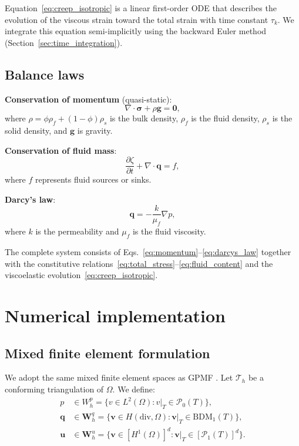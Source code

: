 \documentclass[a4paper,fleqn,longmktitle]{cas-sc}
\begin{document}
Equation~\eqref{eq:creep_isotropic} is a linear first-order ODE that describes
the evolution of the viscous strain toward the total strain with time constant
$\tau_k$. We integrate this equation semi-implicitly using the backward Euler
method (Section~\ref{sec:time_integration}).

\subsection{Balance laws}

\noindent\textbf{Conservation of momentum} (quasi-static):
\begin{equation}
\nabla\cdot\bm{\sigma} + \rho \bm{g} = \bm{0},
\label{eq:momentum}
\end{equation}
where $\rho = \phi \rho_f + (1-\phi)\rho_s$ is the bulk density, $\rho_f$ is
the fluid density, $\rho_s$ is the solid density, and $\bm{g}$ is gravity.

\noindent\textbf{Conservation of fluid mass}:
\begin{equation}
\frac{\partial \zeta}{\partial t} + \nabla\cdot\bm{q} = f,
\label{eq:mass}
\end{equation}
where $f$ represents fluid sources or sinks.

\noindent\textbf{Darcy's law}:
\begin{equation}
\bm{q} = -\frac{k}{\mu_f} \nabla p,
\label{eq:darcys_law}
\end{equation}
where $k$ is the permeability and $\mu_f$ is the fluid viscosity.

The complete system consists of Eqs.~\eqref{eq:momentum}--\eqref{eq:darcys_law}
together with the constitutive relations~\eqref{eq:total_stress}--\eqref{eq:fluid_content}
and the viscoelastic evolution~\eqref{eq:creep_isotropic}.

\section{Numerical implementation}
\label{sec:numerical}

\subsection{Mixed finite element formulation}

We adopt the same mixed finite element spaces as GPMF \citep{Haagenson2020}.
Let $\mathcal{T}_h$ be a conforming triangulation of $\Omega$. We define:
\begin{align}
p &\in W_h^p = \{ v \in L^2(\Omega) : v|_T \in \mathcal{P}_0(T) \},
\label{eq:space_p} \\
\bm{q} &\in \bm{W}_h^q = \{ \bm{v} \in H(\mathrm{div}, \Omega) :
         \bm{v}|_T \in \mathrm{BDM}_1(T) \}, \label{eq:space_q} \\
\bm{u} &\in \bm{W}_h^u = \{ \bm{v} \in [H^1(\Omega)]^d :
         \bm{v}|_T \in [\mathcal{P}_1(T)]^d \}. \label{eq:space_u}
\end{align}
\end{document}
